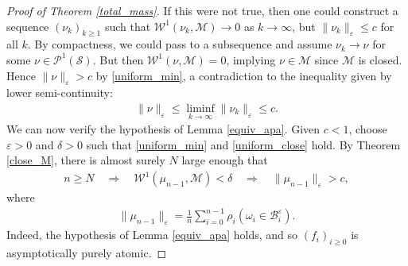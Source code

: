 \documentclass[11pt,reqno]{amsart}
\numberwithin{equation}{section}
\theoremstyle{definition}
\begin{document}
\begin{proof}[Proof of Theorem \ref{total_mass}]
If this were not true, then one could construct a sequence $(\nu_k)_{k \geq 1}$ such that ${\mathcal{W}}^1(\nu_k,{\mathcal{M}}) \to 0$ as $k \to \infty$, but $\|\nu_k\|_{\varepsilon} \leq c$ for all $k$.
By compactness, we could pass to a subsequence and assume $\nu_k \to \nu$ for some $\nu \in {\mathcal{P}}^1({\mathcal{S}})$.
But then ${\mathcal{W}}^1(\nu,{\mathcal{M}}) = 0$, implying $\nu \in {\mathcal{M}}$ since ${\mathcal{M}}$ is closed.
Hence $\|\nu\|_{\varepsilon} > c$ by \eqref{uniform_min}, a contradiction to the inequality given by lower semi-continuity:
{\begin{align*} {
\|\nu\|_{\varepsilon} \leq \liminf_{k \to \infty} \|\nu_k\|_{\varepsilon} \leq c.
} \end{align*}}
We can now verify the hypothesis of Lemma \ref{equiv_apa}.
Given $c < 1$, choose ${\varepsilon} > 0$ and $\delta > 0$ such that \eqref{uniform_min} and \eqref{uniform_close} hold.
By Theorem \ref{close_M}, there is almost surely $N$ large enough that
{\begin{align*} {
n \geq N \quad \Rightarrow \quad {\mathcal{W}}^1(\mu_{n-1},{\mathcal{M}}) < \delta
\quad \Rightarrow \quad \|\mu_{n-1}\|_{\varepsilon} > c,
} \end{align*}}
where
{\begin{align*} {
\|\mu_{n-1}\|_{\varepsilon} = \frac{1}{n} \sum_{i = 0}^{n-1} \rho_i(\omega_i \in {\mathcal{B}}_i^{\varepsilon}).
} \end{align*}}
Indeed, the hypothesis of Lemma \ref{equiv_apa} holds, and so $(f_i)_{i \geq 0}$ is asymptotically purely atomic.


\end{proof}
\end{document}
